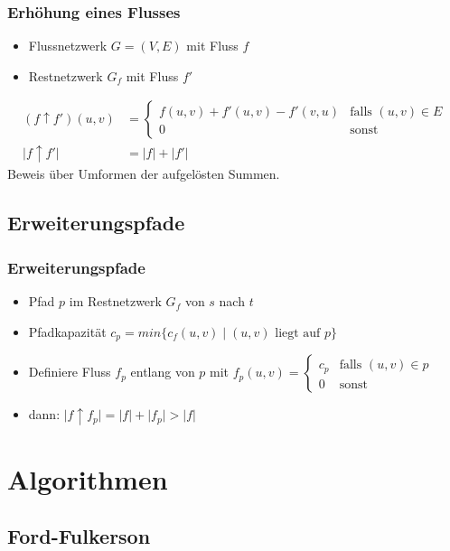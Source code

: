\documentclass{beamer}
\newcommand{\ff}{Ford-Fulkerson}
\begin{document}
\begin{frame}
\frametitle{Erhöhung eines Flusses}
\begin{itemize}
\item Flussnetzwerk $G=(V,E)$ mit Fluss $f$
\item Restnetzwerk $G_f$ mit Fluss $f'$
\end{itemize}
\vspace{0.05\textheight}
\begin{align*}
(f \uparrow f')(u,v)&=
\begin{cases}
f(u,v) + f'(u,v) - f'(v,u) & \text{falls $(u,v) \in E$}\\
0 & \text{sonst}
\end{cases}\\
\lvert f\uparrow f' \rvert &= \lvert f \rvert + \lvert f'\rvert
\end{align*}
\vspace{0.05\textheight}
Beweis über Umformen der aufgelösten Summen.
\end{frame}

\subsection{Erweiterungspfade}
\begin{frame}
\frametitle{Erweiterungspfade}
\begin{itemize}
\item Pfad $p$ im Restnetzwerk $G_f$ von $s$ nach $t$
\item Pfadkapazität $c_p = min\{ c_f(u,v)\mid (u,v) \text{ liegt auf $p$}\}$
\item Definiere Fluss $f_p$ entlang von $p$ mit $f_p(u,v) = \begin{cases}c_p & \text{falls $(u,v)\in p$}\\0 & \text{sonst}\end{cases}$
\item dann: $\lvert f\uparrow f_p \rvert = \lvert f \rvert + \lvert f_p\rvert > \lvert f\rvert$
\end{itemize}
\end{frame}

\section{Algorithmen}
\subsection{Ford-Fulkerson}
\end{document}
